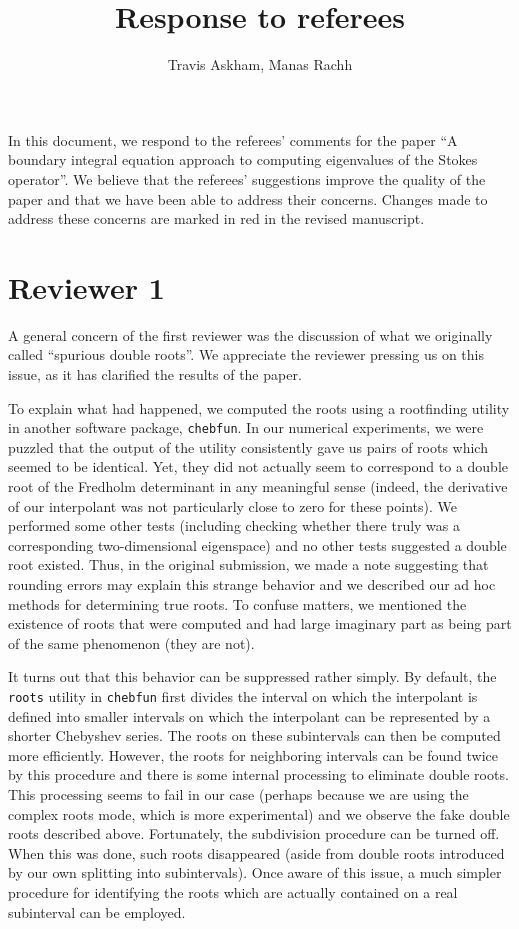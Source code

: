 \documentclass{article}
\title{Response to referees}
\author{Travis Askham, Manas Rachh}
\begin{document}
\maketitle

In this document, we respond to the referees' comments
for the paper ``A boundary integral equation approach to computing
eigenvalues of the Stokes operator''.
We believe that the referees' suggestions improve the
quality of the paper and that we have been able to
address their concerns. Changes made to address these concerns
are marked in {\color{red} red} in the revised manuscript.

\section{Reviewer 1}

A general concern of the first reviewer was the discussion
of what we originally called ``spurious double roots''.
We appreciate the reviewer pressing us on this issue, as it
has clarified the results of the paper.

To explain what had happened, we computed the roots using a rootfinding
utility in another software package, \texttt{chebfun}. In our
numerical experiments, we were puzzled that the output of the
utility consistently gave us pairs of roots which seemed to
be identical. Yet, they did not actually seem to correspond to
a double root of the Fredholm determinant in any meaningful sense
(indeed, the derivative of our interpolant was not particularly
close to zero for these points). We performed some other tests
(including checking whether there truly was a corresponding
two-dimensional eigenspace) and no other tests suggested a double
root existed. Thus, in the original submission, we made a note
suggesting that rounding errors may explain this strange behavior
and we described our ad hoc methods for determining true roots.
To confuse matters, we mentioned the existence of roots that
were computed and had large imaginary part as being part of
the same phenomenon (they are not).

It turns out that this behavior can be suppressed rather
simply. By default, the \texttt{roots}
utility in \texttt{chebfun} first divides the interval on
which the interpolant is defined into smaller intervals on which
the interpolant can be represented by a shorter Chebyshev series.
The roots on these subintervals can then be computed more efficiently.
However, the roots for neighboring intervals can be found twice
by this procedure and there is some internal processing to eliminate
double roots. This processing seems to fail in our case (perhaps because
we are using the complex roots mode, which is more experimental) and
we observe the fake double roots described above. Fortunately, the
subdivision procedure can be turned off. When this was done, such
roots disappeared (aside from double roots introduced by our
own splitting into subintervals). Once aware of this issue,
a much simpler procedure for identifying the roots which are actually
contained on a real subinterval can be employed.
\end{document}
